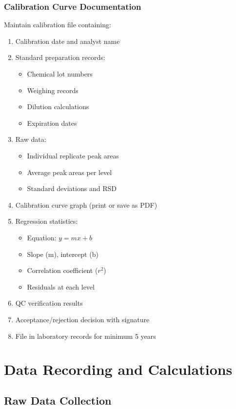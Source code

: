 \documentclass[11pt,a4paper]{article}\usepackage[]{graphicx}\usepackage[]{xcolor}
\begin{document}
\subsubsection{Calibration Curve Documentation}
Maintain calibration file containing:
\begin{enumerate}[noitemsep]
    \item Calibration date and analyst name
    \item Standard preparation records:
    \begin{itemize}
        \item Chemical lot numbers
        \item Weighing records
        \item Dilution calculations
        \item Expiration dates
    \end{itemize}
    \item Raw data:
    \begin{itemize}
        \item Individual replicate peak areas
        \item Average peak areas per level
        \item Standard deviations and RSD
    \end{itemize}
    \item Calibration curve graph (print or save as PDF)
    \item Regression statistics:
    \begin{itemize}
        \item Equation: $y = mx + b$
        \item Slope (m), intercept (b)
        \item Correlation coefficient ($r^2$)
        \item Residuals at each level
    \end{itemize}
    \item QC verification results
    \item Acceptance/rejection decision with signature
    \item File in laboratory records for minimum 5 years
\end{enumerate}

\section{Data Recording and Calculations}

\subsection{Raw Data Collection}
\end{document}
